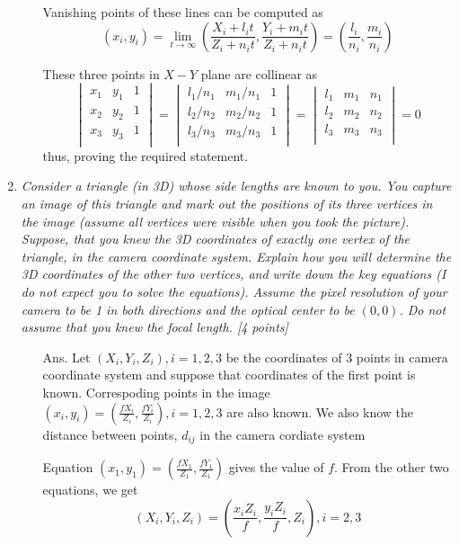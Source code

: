 \documentclass[11pt]{article}
\begin{document}
\begin{enumerate}
\begin{itemize}
	Vanishing points of these lines can be computed as
	\[
		(x_i,y_i) = \lim_{t \to \infty} \left (\frac{X_i+l_it}{Z_i+n_it},\frac{Y_i+m_it}{Z_i+n_it}\right )
				  = \left (\frac{l_i}{n_i}, \frac{m_i}{n_i}\right )
	\]

	These three points in $X-Y$ plane are collinear as 
	\[
		\begin{vmatrix}
		x_1& y_1& 1	\\
		x_2& y_2& 1	\\
		x_3& y_3& 1 \\	
		\end{vmatrix}
		  = 
		\begin{vmatrix}
		l_1/n_1& m_1/n_1& 1	\\
		l_2/n_2& m_2/n_2& 1	\\
		l_3/n_3& m_3/n_3& 1	\\	
		\end{vmatrix}
		  =		
		\begin{vmatrix}
		l_1& m_1& n_1	\\
		l_2& m_2& n_2	\\
		l_3& m_3& n_3	\\	
		\end{vmatrix}
		  = 0
	\]
	thus, proving the required statement.
\end{itemize}

\item \textit{Consider a triangle (in 3D) whose side lengths are known to you. You capture an image of this triangle and mark out the positions of its three vertices in the image (assume all vertices were visible when you took the picture). Suppose, that you knew the 3D coordinates of exactly one vertex of the triangle, in the camera coordinate system. Explain how you will determine the 3D coordinates of the other two vertices, and write down the key equations (I do not expect you to solve the equations). Assume the pixel resolution of your camera to be 1 in both directions and the optical center to be $(0,0)$. Do not assume that you knew the focal length. \textsf{[4 points]}}
\begin{itemize}
	\item[Ans.]	Let $(X_i,Y_i,Z_i), i= 1,2,3$ be the coordinates of 3 points in camera coordinate system and suppose that coordinates of the first point is known. Correspoding points in the image $(x_i,y_i) = \left(\frac{fX_i}{Z_i},\frac{fY_i}{Z_i}\right), i = 1,2,3$ are also known. We also know the distance between points, $d_{ij}$ in the camera cordiate system
	

	Equation $(x_1,y_1) = \left(\frac{fX_1}{Z_1},\frac{fY_1}{Z_1}\right)$ gives the value of $f$. From the other two equations, we get 
	\[
	(X_i,Y_i,Z_i) = \left (\frac{x_iZ_i}{f},\frac{y_iZ_i}{f},Z_i\right ), i= 2,3
	\]


\end{itemize}
\end{enumerate}
\end{document}
